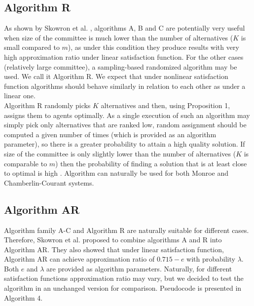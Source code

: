 \subsection{Algorithm R}

As shown by Skowron et al. \cite{1}, algorithms A, B and C are potentially very useful when size of the committee is much lower than the number of alternatives ($K$ is small compared to $m$), as under this condition they produce results with very high approximation ratio under linear satisfaction function. For the other cases (relatively large committee), a sampling-based randomized algorithm may be used. We call it Algorithm R. We expect that under nonlinear satisfaction function algorithms should behave similarly in relation to each other as under a linear one.
\\

Algorithm R randomly picks $K$ alternatives and then, using Proposition 1, assigns them to agents optimally. As a single execution of such an algorithm may simply pick only alternatives that are ranked low, random assignment should be computed a given number of times (which is provided as an algorithm parameter), so there is a greater probability to attain a high quality solution. If size of the committee is only slightly lower than the number of alternatives ($K$ is comparable to $m$) then the probability of finding a solution that is at least close to optimal is high \cite{1}. Algorithm can naturally be used for both Monroe and Chamberlin-Courant systems.

\subsection{Algorithm AR}

Algorithm family A-C and Algorithm R are naturally suitable for different cases. Therefore, Skowron et al. \cite{1} proposed to combine algorithms A and R into Algorithm AR. They also showed that under linear satisfaction function, Algorithm AR can achieve approximation ratio of $0.715 - e$ with probability $\lambda$. Both $e$ and $\lambda$ are provided as algorithm parameters. Naturally, for different satisfaction functions approximation ratio may vary, but we decided to test the algorithm in an unchanged version for comparison. Pseudocode is presented in Algorithm 4.


